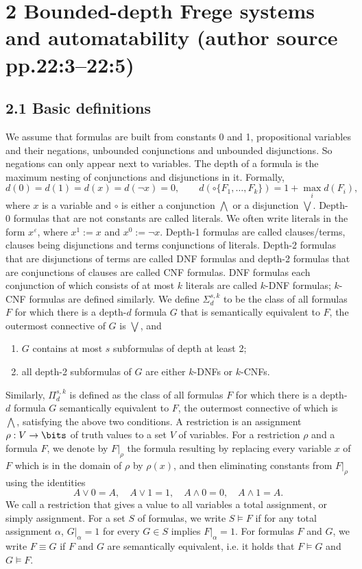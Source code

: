 \section*{2 Bounded-depth Frege systems and automatability (author source pp.22:3--22:5)}
\subsection*{2.1 Basic definitions}
We assume that formulas are built from constants 0 and 1, propositional variables and their negations, unbounded conjunctions and unbounded disjunctions. So negations can only appear next to variables. The depth of a formula is the maximum nesting of conjunctions and disjunctions in it. Formally,
\[d(0)=d(1)=d(x)=d(\neg x)=0,\qquad d(\circ\{F_1,\ldots,F_k\})=1+\max_i d(F_i),\]
where $x$ is a variable and $\circ$ is either a conjunction $\bigwedge$ or a disjunction $\bigvee$.
Depth-0 formulas that are not constants are called literals. We often write literals in the form $x^\varepsilon$, where $x^1:=x$ and $x^0:=\neg x$. Depth-1 formulas are called clauses/terms, clauses being disjunctions and terms conjunctions of literals. Depth-2 formulas that are disjunctions of terms are called DNF formulas and depth-2 formulas that are conjunctions of clauses are called CNF formulas. DNF formulas each conjunction of which consists of at most $k$ literals are called $k$-DNF formulas; $k$-CNF formulas are defined similarly. We define $\Sigma_d^{s,k}$ to be the class of all formulas $F$ for which there is a depth-$d$ formula $G$ that is semantically equivalent to $F$, the outermost connective of $G$ is $\bigvee$, and
\begin{enumerate}\item $G$ contains at most $s$ subformulas of depth at least 2;\item all depth-2 subformulas of $G$ are either $k$-DNFs or $k$-CNFs.\end{enumerate}
Similarly, $\Pi_d^{s,k}$ is defined as the class of all formulas $F$ for which there is a depth-$d$ formula $G$ semantically equivalent to $F$, the outermost connective of which is $\bigwedge$, satisfying the above two conditions.
A restriction is an assignment $\rho:V\to\bits$ of truth values to a set $V$ of variables. For a restriction $\rho$ and a formula $F$, we denote by $F|_\rho$ the formula resulting by replacing every variable $x$ of $F$ which is in the domain of $\rho$ by $\rho(x)$, and then eliminating constants from $F|_\rho$ using the identities
\[A\vee0=A,\quad A\vee1=1,\quad A\wedge0=0,\quad A\wedge1=A.\]
We call a restriction that gives a value to all variables a total assignment, or simply assignment. For a set $S$ of formulas, we write $S\models F$ if for any total assignment $\alpha$, $G|_\alpha=1$ for every $G\in S$ implies $F|_\alpha=1$. For formulas $F$ and $G$, we write $F\equiv G$ if $F$ and $G$ are semantically equivalent, i.e. it holds that $F\models G$ and $G\models F$.
